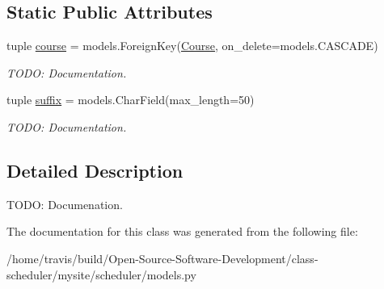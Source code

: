\subsection*{Static Public Attributes}
\begin{DoxyCompactItemize}
\item 
\hypertarget{classscheduler_1_1models_1_1_section_ac4fd835769f6add9617f8885b0d225fe}{tuple \hyperlink{classscheduler_1_1models_1_1_section_ac4fd835769f6add9617f8885b0d225fe}{course} = models.\-Foreign\-Key(\hyperlink{classscheduler_1_1models_1_1_course}{Course}, on\-\_\-delete=models.\-C\-A\-S\-C\-A\-D\-E)}\label{classscheduler_1_1models_1_1_section_ac4fd835769f6add9617f8885b0d225fe}

\begin{DoxyCompactList}\small\item\em T\-O\-D\-O\-: Documentation. \end{DoxyCompactList}\item 
\hypertarget{classscheduler_1_1models_1_1_section_a7cddf1d09f1567eb46674001375767b7}{tuple \hyperlink{classscheduler_1_1models_1_1_section_a7cddf1d09f1567eb46674001375767b7}{suffix} = models.\-Char\-Field(max\-\_\-length=50)}\label{classscheduler_1_1models_1_1_section_a7cddf1d09f1567eb46674001375767b7}

\begin{DoxyCompactList}\small\item\em T\-O\-D\-O\-: Documentation. \end{DoxyCompactList}\end{DoxyCompactItemize}


\subsection{Detailed Description}
T\-O\-D\-O\-: Documenation. 

The documentation for this class was generated from the following file\-:\begin{DoxyCompactItemize}
\item 
/home/travis/build/\-Open-\/\-Source-\/\-Software-\/\-Development/class-\/scheduler/mysite/scheduler/models.\-py\end{DoxyCompactItemize}
